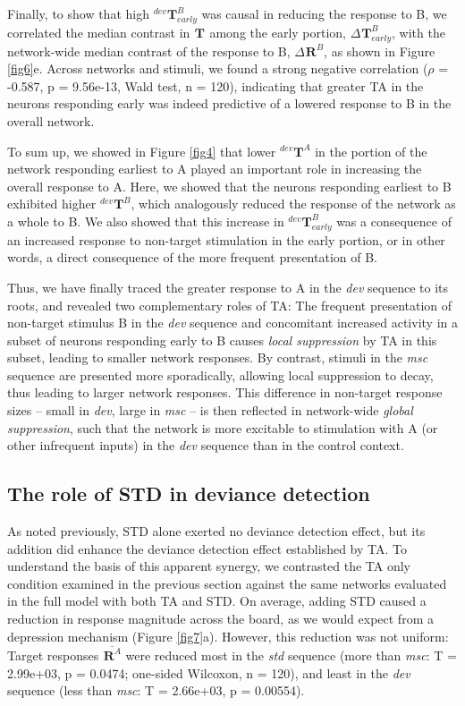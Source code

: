 \documentclass[pdflatex,referee,iicol,sn-basic]{sn-jnl}
\newcommand{\dev}{\textit{dev}}
\newcommand{\msc}{\textit{msc}}
\newcommand{\std}{\textit{std}}
\renewcommand{\R}[3][]{{}^{#1}_{}\!\mathbf{R}^{#2}_{#3}}
\renewcommand{\T}[3][]{{}^{#1}_{}\mathbf{T}^{#2}_{#3}}
\newcommand{\mean}[1]{\overline{#1}}
\theoremstyle{thmstyleone}%
\theoremstyle{thmstyletwo}%
\theoremstyle{thmstylethree}%
\begin{document}
Finally, to show that high $\T[dev]{B}{early}$ was causal in reducing the response to B, we correlated the median contrast in $\T{}{}$ among the early portion, $\Delta \T{B}{early}$, with the network-wide median contrast of the response to B, $\Delta \R{B}{}$, as shown in Figure \ref{fig6}e. Across networks and stimuli, we found a strong negative correlation ($\rho$ = -0.587, p = 9.56e-13, Wald test, n = 120), indicating that greater TA in the neurons responding early was indeed predictive of a lowered response to B in the overall network.

To sum up, we showed in Figure \ref{fig4} that lower $\T[dev]{A}{}$ in the portion of the network responding earliest to A played an important role in increasing the overall response to A. Here, we showed that the neurons responding earliest to B exhibited higher $\T[dev]{B}{}$, which analogously reduced the response of the network as a whole to B. We also showed that this increase in $\T[dev]{B}{early}$ was a consequence of an increased response to non-target stimulation in the early portion, or in other words, a direct consequence of the more frequent presentation of B.

Thus, we have finally traced the greater response to A in the \dev{} sequence to its roots, and revealed two complementary roles of TA: The frequent presentation of non-target stimulus B in the \dev{} sequence and concomitant increased activity in a subset of neurons responding early to B causes \emph{local suppression} by TA in this subset, leading to smaller network responses. By contrast, stimuli in the \msc{} sequence are presented more sporadically, allowing local suppression to decay, thus leading to larger network responses. This difference in non-target response sizes -- small in \dev{}, large in \msc{} -- is then reflected in network-wide \emph{global suppression}, such that the network is more excitable to stimulation with A (or other infrequent inputs) in the \dev{} sequence than in the control context.

\subsection{The role of STD in deviance detection}\label{sec-std}

As noted previously, STD alone exerted no deviance detection effect, but its addition did enhance the deviance detection effect established by TA. To understand the basis of this apparent synergy, we contrasted the TA only condition examined in the previous section against the same networks evaluated in the full model with both TA and STD. On average, adding STD caused a reduction in response magnitude across the board, as we would expect from a depression mechanism (Figure \ref{fig7}a). However, this reduction was not uniform: Target responses $\mean{\R{A}{}}$ were reduced most in the \std{} sequence (more than \msc{}: T = 2.99e+03, p = 0.0474; one-sided Wilcoxon, n = 120), and least in the \dev{} sequence (less than \msc{}: T = 2.66e+03, p = 0.00554).
\end{document}
